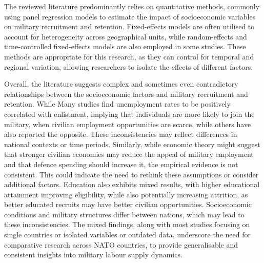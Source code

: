 The reviewed literature predominantly relies on quantitative methods, commonly using 
panel regression models to estimate the impact of socioeconomic variables on 
military recruitment and retention. Fixed-effects models are often utilised to account for 
heterogeneity across geographical units, while random-effects and time-controlled fixed-effects
models are also employed in some studies. These methods are appropriate for this 
research, as they can control for temporal and regional variation, allowing 
researchers to isolate the effects of different factors.

Overall, the literature suggests complex and sometimes even contradictory relationships 
between the socioeconomic factors and military recruitment and retention. While 
Many studies find unemployment rates to be positively correlated 
with enlistment, implying that individuals are more likely to join the military, when 
civilian employment opportunities are scarce, while others have also reported the opposite. 
These inconsistencies may reflect differences in national 
contexts or time periods. Similarly, while economic theory might suggest that 
stronger civilian economies may reduce the appeal of military employment and that 
defence spending should increase it, the empirical evidence is not consistent.
This could indicate the need to rethink these assumptions or consider additional 
factors. Education also exhibits mixed results, with higher educational attainment 
improving eligibility, while also potentially increasing attrition, as better educated recruits 
may have better civilian opportunities. Socioeconomic conditions and 
military structures differ between nations, which may lead to these inconsistencies.
The mixed findings, along with most studies 
focusing on single countries or isolated variables or outdated data, underscore the 
need for comparative research across NATO countries, to provide generalisable and 
consistent insights into military labour supply dynamics. 

